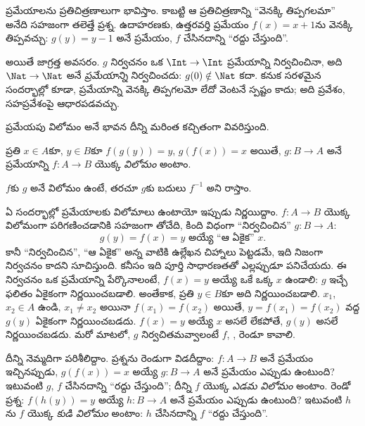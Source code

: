 \documentclass[../../../include/open-logic-section]{subfiles}
\begin{document}

\begin{explain}
ప్రమేయాలను ప్రతిచిత్రణాలుగా భావిస్తాం. కాబట్టి ఆ ప్రతిచిత్రణాన్ని
``వెనక్కి తిప్పగలమా'' అనేది సహజంగా తలెత్తే ప్రశ్న.
ఉదాహరణకు, ఉత్తరవర్తి ప్రమేయం $f(x) = x + 1$ను వెనక్కి తిప్పవచ్చు:
$g(y) = y - 1$ అనే ప్రమేయం, $f$ చేసినదాన్ని ``రద్దు చేస్తుంది''.

అయితే జాగ్రత్త అవసరం. $g$ నిర్వచనం ఒక $\Int \to \Int$ ప్రమేయాన్ని
నిర్వచించినా, అది $\Nat \to \Nat$ అనే \emph{ప్రమేయాన్ని} నిర్వచించదు:
$g(0) \notin \Nat$ కదా. కనుక సరళమైన సందర్భాల్లో కూడా, ప్రమేయాన్ని
వెనక్కి తిప్పగలమో లేదో వెంటనే స్పష్టం కాదు; అది ప్రవేశం,
సహప్రవేశంపై ఆధారపడవచ్చు.

ప్రమేయపు విలోమం అనే భావన దీన్ని మరింత కచ్చితంగా వివరిస్తుంది.
\end{explain}

\begin{defn}
ప్రతి $x \in A$కూ, $y \in B$కూ $f(g(y)) = y$, $g(f(x)) = x$
అయితే, $g \colon B \to A$ అనే ప్రమేయాన్ని
$f \colon A \to B$ యొక్క \emph{విలోమం} అంటాం.
\end{defn}

$f$కు $g$ అనే విలోమం ఉంటే, తరచూ $g$కు బదులు $f^{-1}$ అని రాస్తాం.

\begin{explain}
ఏ సందర్భాల్లో ప్రమేయాలకు విలోమాలు ఉంటాయో ఇప్పుడు నిర్ణయిద్దాం.
$f\colon A \to B$ యొక్క విలోమంగా పరిగణించడానికి సహజంగా తోచేది,
కింది విధంగా ``నిర్వచించిన'' $g\colon B \to A$:
\[
g(y) = \text{$f(x) = y$ అయ్యే ``ఆ ఏకైక'' $x$.}
\]
కానీ ``నిర్వచించిన'', ``ఆ ఏకైక'' అన్న వాటికి ఉల్లేఖన చిహ్నాలు
పెట్టడమే, ఇది నిజంగా నిర్వచనం కాదని సూచిస్తుంది.
కనీసం ఇది పూర్తి సాధారణతతో ఎల్లప్పుడూ పనిచేయదు.
ఈ నిర్వచనం ఒక ప్రమేయాన్ని పేర్కొనాలంటే, $f(x) = y$ అయ్యే
ఒకే ఒక్క $x$ ఉండాలి: $g$ ఇచ్చే ఫలితం ఏకైకంగా నిర్ణయించబడాలి.
అంతేకాక, ప్రతి $y \in B$కూ అది నిర్ణయించబడాలి.
$x_1$, $x_2 \in A$ ఉండి, $x_1 \neq x_2$ అయినా $f(x_1) = f(x_2)$ అయితే,
$y = f(x_1) = f(x_2)$ వద్ద $g(y)$ ఏకైకంగా నిర్ణయించబడదు.
$f(x) = y$ అయ్యే $x$ అసలే లేకపోతే, $g(y)$ అసలే నిర్ణయించబడదు.
మరో మాటలో, $g$ నిర్వచితమవ్వాలంటే $f$, ,  రెండూ కావాలి.

దీన్ని నెమ్మదిగా పరిశీలిద్దాం. ప్రశ్నను రెండుగా విడదీద్దాం:
$f\colon A \to B$ అనే ప్రమేయం ఇచ్చినప్పుడు, $g(f(x)) = x$ అయ్యే
$g\colon B \to A$ అనే ప్రమేయం ఎప్పుడు ఉంటుంది?
ఇటువంటి $g$, $f$ చేసినదాన్ని ``రద్దు చేస్తుంది'';
దీన్ని $f$ యొక్క \emph{ఎడమ విలోమం} అంటాం.
రెండో ప్రశ్న: $f(h(y)) = y$ అయ్యే $h\colon B \to A$ అనే ప్రమేయం
ఎప్పుడు ఉంటుంది? ఇటువంటి $h$ను $f$ యొక్క \emph{కుడి విలోమం} అంటాం:
$h$ చేసినదాన్ని $f$ ``రద్దు చేస్తుంది''.
\end{explain}
\end{document}
